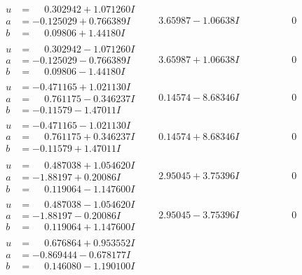 \documentclass[1p]{elsarticle_modified}
\theoremstyle{definition}
\begin{document}
$$\begin{array}{c|c|c}
\begin{aligned}
u &= \phantom{-}0.302942 + 1.071260 I \\
a &= -0.125029 + 0.766389 I \\
b &= \phantom{-}0.09806 + 1.44180 I\end{aligned}
 & \phantom{-}3.65987 - 1.06638 I & \phantom{-0.000000 } 0 \\ \hline\begin{aligned}
u &= \phantom{-}0.302942 - 1.071260 I \\
a &= -0.125029 - 0.766389 I \\
b &= \phantom{-}0.09806 - 1.44180 I\end{aligned}
 & \phantom{-}3.65987 + 1.06638 I & \phantom{-0.000000 } 0 \\ \hline\begin{aligned}
u &= -0.471165 + 1.021130 I \\
a &= \phantom{-}0.761175 - 0.346237 I \\
b &= -0.11579 - 1.47011 I\end{aligned}
 & \phantom{-}0.14574 - 8.68346 I & \phantom{-0.000000 } 0 \\ \hline\begin{aligned}
u &= -0.471165 - 1.021130 I \\
a &= \phantom{-}0.761175 + 0.346237 I \\
b &= -0.11579 + 1.47011 I\end{aligned}
 & \phantom{-}0.14574 + 8.68346 I & \phantom{-0.000000 } 0 \\ \hline\begin{aligned}
u &= \phantom{-}0.487038 + 1.054620 I \\
a &= -1.88197 + 0.20086 I \\
b &= \phantom{-}0.119064 - 1.147600 I\end{aligned}
 & \phantom{-}2.95045 + 3.75396 I & \phantom{-0.000000 } 0 \\ \hline\begin{aligned}
u &= \phantom{-}0.487038 - 1.054620 I \\
a &= -1.88197 - 0.20086 I \\
b &= \phantom{-}0.119064 + 1.147600 I\end{aligned}
 & \phantom{-}2.95045 - 3.75396 I & \phantom{-0.000000 } 0 \\ \hline\begin{aligned}
u &= \phantom{-}0.676864 + 0.953552 I \\
a &= -0.869444 - 0.678177 I \\
b &= \phantom{-}0.146080 - 1.190100 I\end{aligned}

\end{array}$$
\end{document}
